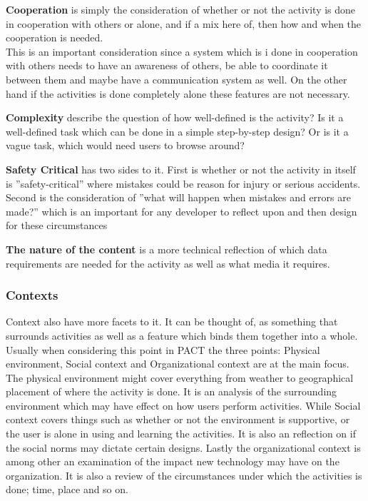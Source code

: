 \textbf{Cooperation} is simply the consideration of whether or not the activity is done in cooperation with others or alone, and if a mix here of, then how and when the cooperation is needed.
\\\indent
This is an important consideration since a system which is i done in cooperation with others needs to have an awareness of others, be able to coordinate it between them and maybe have a communication system as well.
On the other hand if the activities is done completely alone these features are not necessary.

\textbf{Complexity} describe the question of how well-defined is the activity?
Is it a well-defined task which can be done in a simple step-by-step design?
Or is it a vague task, which would need users to browse around?

\textbf{Safety Critical} has two sides to it.
First is whether or not the activity in itself is ''safety-critical'' where mistakes could be reason for injury or serious accidents.
Second is the consideration of ''what will happen when mistakes and errors are made?'' which is an important for any developer to reflect upon and then design for these circumstances

\textbf{The nature of the content} is a more technical reflection of which data requirements are needed for the activity as well as what media it requires.

\subsubsection{Contexts}
Context also have more facets to it.
It can be thought of, as something that surrounds activities as well as a feature which binds them together into a whole.
Usually when considering this point in PACT the three points: Physical environment, Social context and Organizational context are at the main focus.
\\\indent
The physical environment might cover everything from weather to geographical placement of where the activity is done.
It is an analysis of the surrounding environment which may have effect on how users perform activities.
While Social context covers things such as whether or not the environment is supportive, or the user is alone in using and learning the activities.
It is also an reflection on if the social norms may dictate certain designs.
Lastly the organizational context is among other an examination of the impact new technology may have on the organization.
It is also a review of the circumstances under which the activities is done; time, place and so on.

